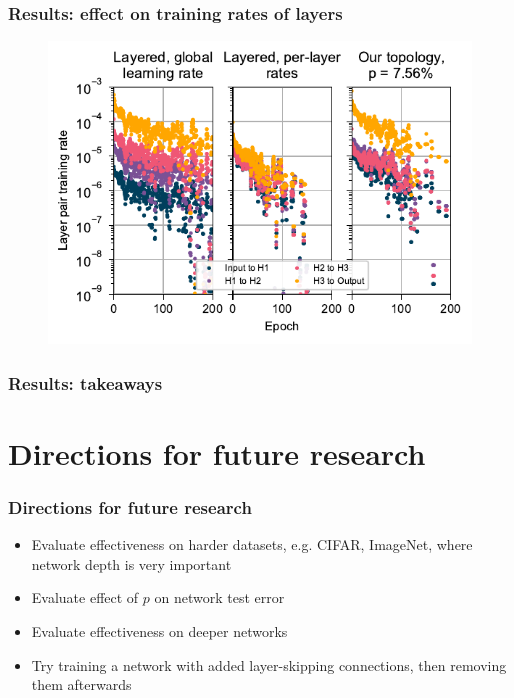 \documentclass[pdf]{beamer}
\begin{document}
\begin{frame}
	\frametitle{Results: effect on training rates of layers}
	\begin{figure}
		\includegraphics[width=\textwidth]{figures/perlayer_global+original+ours.pdf}
	\end{figure}
\end{frame}

\begin{frame}
	\frametitle{Results: takeaways}
\end{frame}

\section{Directions for future research}
\begin{frame}
	\frametitle{Directions for future research}
	\begin{itemize}
		\item<1-> Evaluate effectiveness on harder datasets, e.g. CIFAR, ImageNet, where network depth is very important
		\item<2-> Evaluate effect of $p$ on network test error
		\item<3-> Evaluate effectiveness on deeper networks
		\item<4-> Try training a network with added layer-skipping connections, then removing them afterwards
	\end{itemize}
\end{frame}

\begin{frame} %

\end{frame}
\end{document}
